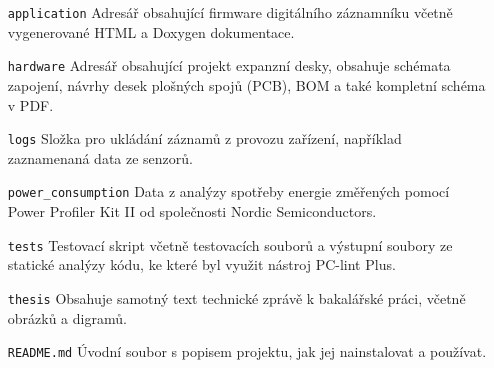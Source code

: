 \begin{itemize}[leftmargin=2cm]
    
    \item[\texttt{application}] Adresář obsahující firmware digitálního záznamníku včetně vygenerované HTML a Doxygen dokumentace.

    \item[\texttt{hardware}] Adresář obsahující projekt expanzní desky, obsahuje schémata zapojení, návrhy desek plošných spojů (PCB), BOM a také kompletní schéma v PDF.

    \item[\texttt{logs}] Složka pro ukládání záznamů z provozu zařízení, například zaznamenaná data ze senzorů.

    \item[\texttt{power\_consumption}] Data z analýzy spotřeby energie změřených pomocí Power Profiler Kit II od společnosti Nordic Semiconductors.

    \item[\texttt{tests}] Testovací skript včetně testovacích souborů a výstupní soubory ze statické analýzy kódu, ke které byl využit nástroj PC-lint Plus.

    \item[\texttt{thesis}] Obsahuje samotný text technické zprávě k bakalářské práci, včetně obrázků a digramů.

    \item[\texttt{README.md}] Úvodní soubor s popisem projektu, jak jej nainstalovat a používat.
\end{itemize}


%
